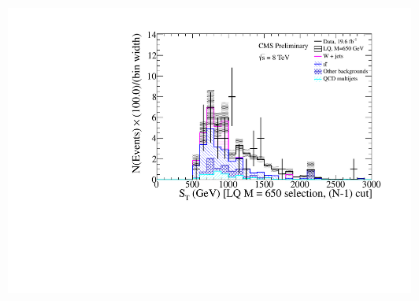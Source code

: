 \documentclass[bigger]{beamer}
\begin{document}
\begin{frame}
\begin{columns}
\begin{column}{0.55\textwidth}
\centering
\includegraphics[width=0.8\textwidth]{fig/enu/nMinus1/ST_mtAndMetAndMejLQ650_enujj.pdf}
\end{column}
\end{columns}
\end{frame}
\end{document}
